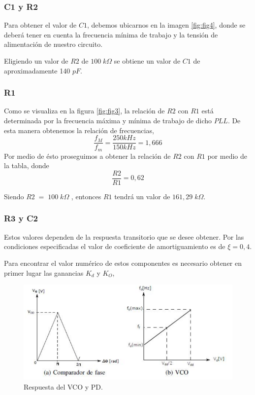 \documentclass[twocolumn]{article}
\begin{document}
\subsubsection{C1 y R2}
Para obtener el valor de $C1$, debemos ubicarnos en la imagen \textcolor{blue}{{\ref{fig:fig4}}}, donde se deberá tener en cuenta la frecuencia mínima de trabajo y la tensión de alimentación de nuestro circuito. 

Eligiendo un valor de $R2$ de $100 \; k \Omega$ se obtiene un valor de $C1$ de aproximadamente 140 $pF$. 

\subsubsection{R1}
Como se visualiza en la figura \textcolor{blue}{{\ref{fig:fig3}}}, la relación de $R2$ con $R1$ está determinada por la frecuencia máxima y mínima de trabajo de dicho $PLL$. De esta manera obtenemos la relación de frecuencias,
\[ \frac{f_M}{f_m} = \frac{250kHz}{150kHz} = 1,666 \]
Por medio de ésto proseguimos a obtener la relación de $R2$ con $R1$ por medio de la tabla, donde 
$$ \frac{R2}{R1} = 0,62 $$

Siendo $R2 \; = \; 100 \; k \Omega$ , entonces $R1$ tendrá un valor de $161,29 \; k\Omega$.

\subsubsection{R3 y C2}

Estos valores dependen de la respuesta transitorio que se desee obtener. Por las condiciones especificadas el valor de coeficiente de amortiguamiento es de $\xi = 0,4$.

Para encontrar el valor numérico de estos componentes es necesario obtener en primer lugar las ganancias $K_d$ y $K_O$,

\begin{figure}[H]
  \centering    
  \includegraphics[width=\columnwidth]{imagenes/fig5.jpg}
	\caption{Respuesta del VCO y PD.}\label{fig:fig5}
\end{figure}
\end{document}
